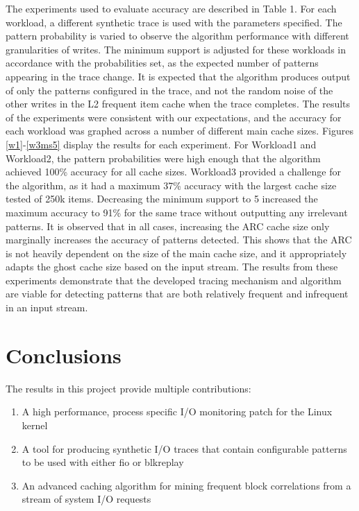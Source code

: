 \documentclass[MEng]{uofl}
\begin{document}
The experiments used to evaluate accuracy are described in Table 1. For each workload, a different synthetic trace is used with the parameters specified. The pattern probability is varied to observe the algorithm performance with different granularities of writes. The minimum support is adjusted for these workloads in accordance with the probabilities set, as the expected number of patterns appearing in the trace change. It is expected that the algorithm produces output of only the patterns configured in the trace, and not the random noise of the other writes in the L2 frequent item cache when the trace completes. The results of the experiments were consistent with our expectations, and the accuracy for each workload was graphed across a number of different main cache sizes. Figures \ref{w1}-\ref{w3ms5} display the results for each experiment. For Workload1 and Workload2, the pattern probabilities were high enough that the algorithm achieved 100\% accuracy for all cache sizes. Workload3 provided a challenge for the algorithm, as it had a maximum 37\% accuracy with the largest cache size tested of 250k items. Decreasing the minimum support to 5 increased the maximum accuracy to 91\% for the same trace without outputting any irrelevant patterns. It is observed that in all cases, increasing the ARC cache size only marginally increases the accuracy of patterns detected. This shows that the ARC is not heavily dependent on the size of the main cache size, and it appropriately adapts the ghost cache size based on the input stream. The results from these experiments demonstrate that the developed tracing mechanism and algorithm are viable for detecting patterns that are both relatively frequent and infrequent in an input stream. 

\chapter{Conclusions}
The results in this project provide multiple contributions: 
\begin{enumerate}
    \item A high performance, process specific I/O monitoring patch for the Linux kernel
    \item A tool for producing synthetic I/O traces that contain configurable patterns to be used with either fio or blkreplay 
    \item An advanced caching algorithm for mining frequent block correlations from a \\ stream of system I/O requests
\end{enumerate}
\end{document}

